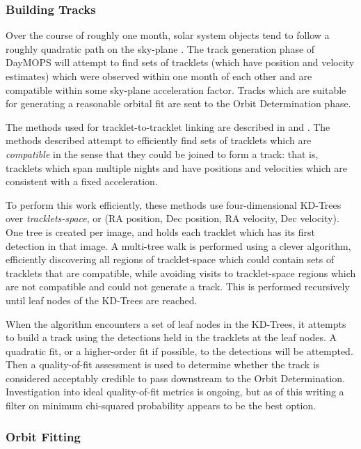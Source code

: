 \documentclass[12pt,preprint]{aastex}
\begin{document}
\subsubsection{Building Tracks}

Over the course of roughly one month, solar system objects tend to
follow a roughly quadratic path on the sky-plane
\citep{kubica_thesis}.  The track generation phase of DayMOPS will
attempt to find sets of tracklets (which have position and velocity
estimates) which were observed within one month of each other and are
compatible within some sky-plane acceleration factor.  Tracks which
are suitable for generating a reasonable orbital fit are sent to the
Orbit Determination phase. 

The methods used for tracklet-to-tracklet linking are described in
\citet{kubica_thesis} and \citet{Kubica:2005:MTA:1081870.1081889}.
The methods described attempt to efficiently find sets of tracklets
which are \textit{compatible} in the sense that they could be joined
to form a track: that is, tracklets which span multiple nights and
have positions and velocities which are consistent with a fixed
acceleration.  

To perform this work efficiently, these methods use four-dimensional
KD-Trees over \textit{tracklets-space}, or (RA position, Dec position,
RA velocity, Dec velocity). One tree is created per image, and holds
each tracklet which has its first detection in that image.  A
multi-tree walk is performed using a clever algorithm, efficiently
discovering all regions of tracklet-space which could contain sets of
tracklets that are compatible, while avoiding visits to tracklet-space
regions which are not compatible and could not generate a track.  This
is performed recursively until leaf nodes of the KD-Trees are reached.


When the algorithm encounters a set of leaf nodes in the KD-Trees, it
attempts to build a track using the detections held in the tracklets
at the leaf nodes.  A quadratic fit, or a higher-order fit if
possible, to the detections will be attempted.  Then a quality-of-fit
assessment is used to determine whether the track is considered
acceptably credible to pass downstream to the Orbit Determination.
Investigation into ideal quality-of-fit metrics is ongoing, but as of
this writing a filter on minimum chi-squared probability appears to be
the best option.


\subsubsection{Orbit Fitting}
\label{orbitFitting}
\end{document}
